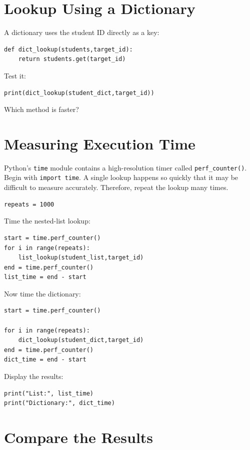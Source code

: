 \documentclass{article}
\begin{document}
\section{Lookup Using a Dictionary}

A dictionary uses the student ID directly as a key:

\begin{verbatim}
def dict_lookup(students,target_id):
    return students.get(target_id)
\end{verbatim}
\noindent
Test it:

\begin{verbatim}
print(dict_lookup(student_dict,target_id))
\end{verbatim}
\noindent
Which method is faster?

\section{Measuring Execution Time}

Python's \texttt{time} module contains a high-resolution timer called \texttt{perf\_counter()}.  Begin with \texttt{import time}.  A single lookup happens so quickly that it may be difficult to measure accurately. Therefore, repeat the lookup many times.

\begin{verbatim}
repeats = 1000
\end{verbatim}
\noindent
Time the nested-list lookup:

\begin{verbatim}
start = time.perf_counter()
for i in range(repeats):
    list_lookup(student_list,target_id)
end = time.perf_counter()
list_time = end - start
\end{verbatim}
\noindent
Now time the dictionary:

\begin{verbatim}
start = time.perf_counter()

for i in range(repeats):
    dict_lookup(student_dict,target_id)
end = time.perf_counter()
dict_time = end - start
\end{verbatim}
\noindent
Display the results:

\begin{verbatim}
print("List:", list_time)
print("Dictionary:", dict_time)
\end{verbatim}

\section{Compare the Results}
\end{document}
